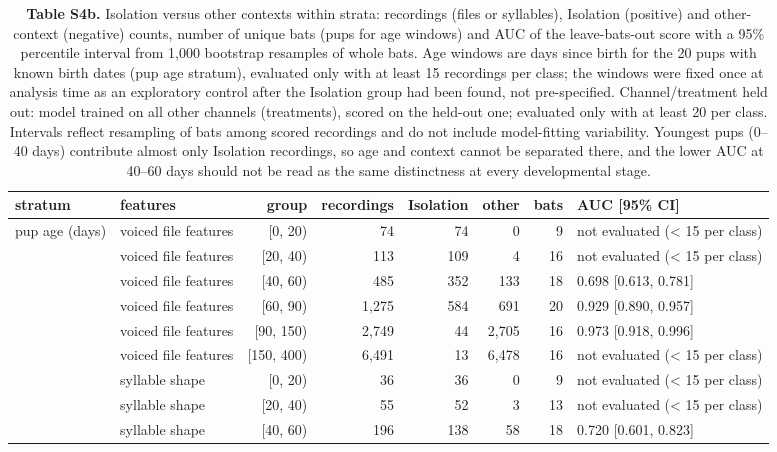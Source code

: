 \begin{table}[htbp]\centering\scriptsize
\caption{\textbf{Table S4b.} Isolation versus other contexts within strata: recordings (files or syllables), Isolation (positive) and other-context (negative) counts, number of unique bats (pups for age windows) and AUC of the leave-bats-out score with a 95\% percentile interval from 1,000 bootstrap resamples of whole bats. Age windows are days since birth for the 20 pups with known birth dates (pup age stratum), evaluated only with at least 15 recordings per class; the windows were fixed once at analysis time as an exploratory control after the Isolation group had been found, not pre-specified. Channel/treatment held out: model trained on all other channels (treatments), scored on the held-out one; evaluated only with at least 20 per class. Intervals reflect resampling of bats among scored recordings and do not include model-fitting variability. Youngest pups (0--40 days) contribute almost only Isolation recordings, so age and context cannot be separated there, and the lower AUC at 40--60 days should not be read as the same distinctness at every developmental stage.}\label{tab:S4b}
\begin{adjustbox}{max width=\linewidth}
\begin{tabular}{llrrrrrl}
\toprule
stratum & features & group & recordings & Isolation & other & bats & AUC [95\% CI] \\
\midrule
pup age (days) & voiced file features & [0, 20) & 74 & 74 & 0 & 9 & not evaluated (< 15 per class) \\
 & voiced file features & [20, 40) & 113 & 109 & 4 & 16 & not evaluated (< 15 per class) \\
 & voiced file features & [40, 60) & 485 & 352 & 133 & 18 & 0.698 [0.613, 0.781] \\
 & voiced file features & [60, 90) & 1,275 & 584 & 691 & 20 & 0.929 [0.890, 0.957] \\
 & voiced file features & [90, 150) & 2,749 & 44 & 2,705 & 16 & 0.973 [0.918, 0.996] \\
 & voiced file features & [150, 400) & 6,491 & 13 & 6,478 & 16 & not evaluated (< 15 per class) \\
 & syllable shape & [0, 20) & 36 & 36 & 0 & 9 & not evaluated (< 15 per class) \\
 & syllable shape & [20, 40) & 55 & 52 & 3 & 13 & not evaluated (< 15 per class) \\
 & syllable shape & [40, 60) & 196 & 138 & 58 & 18 & 0.720 [0.601, 0.823] \\

\end{tabular}
\end{adjustbox}
\end{table}
